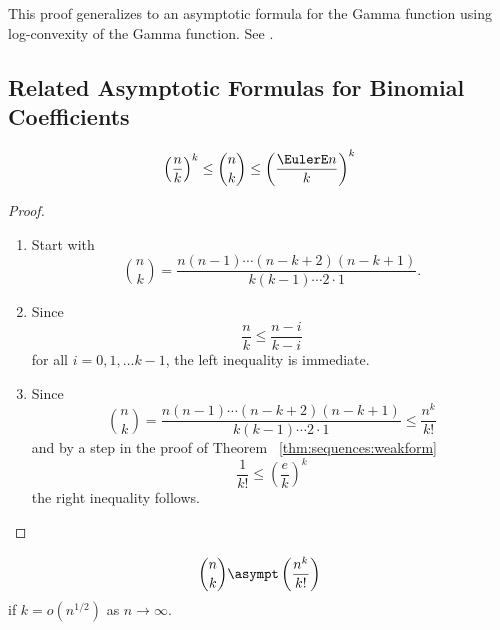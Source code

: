 \documentclass[12pt]{article}
\begin{document}
\begin{remark}
    This proof generalizes to an asymptotic formula for the Gamma
    function using log-convexity of the Gamma function.  See
    \cite{dutkay13}.
\end{remark}

\subsection*{Related Asymptotic Formulas for Binomial Coefficients}

\begin{theorem}
    \[
        \left( \frac{n}{k} \right)^k \le \binom{n}{k} \le \left( \frac{\EulerE
        n}{k} \right)^k
    \]
\end{theorem}

\begin{proof}
    \begin{enumerate}
        \item
            Start with
            \[
                \binom{n}{k} = \frac{n(n-1) \cdots (n-k+2)(n-k+1)}{k(k-1)\cdots
                2 \cdot 1}.
            \]
        \item
            Since
            \[
                \frac{n}{k} \le \frac{n-i}{k-i}
            \] for all \( i = 0, 1, \dots k-1 \), the left inequality is
            immediate.
        \item
            Since
            \[
                \binom{n}{k} = \frac{n(n-1) \cdots (n-k+2)(n-k+1)}{k(k-1)\cdots
                2 \cdot 1} \le \frac{n^k}{k!}
            \] and by a step in the proof of Theorem~%
            \ref{thm:sequences:weakform}
            \[
                \frac{1}{k!} \le \left( \frac{e}{k} \right)^{k}
            \] the right inequality follows.
    \end{enumerate}
\end{proof}

\begin{theorem}
    \[
        \binom{n}{k} \asympt \left(\frac{n^k}{k!} \right)
    \] if \( k = o(n^{1/2}) \) as \( n \to \infty \).
\end{theorem}
\end{document}
